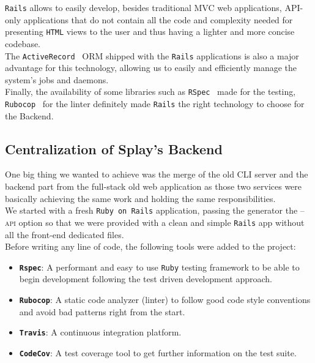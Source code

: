 \documentclass{eplmastersthesis}
\begin{document}
        \texttt{Rails} allows to easily develop, besides traditional MVC web
        applications, API-only applications that do not contain all the code
        and complexity needed for presenting \texttt{HTML} views to the user and thus
        having a lighter and more concise codebase.\\

        The \texttt{ActiveRecord}~\cite{activerecord} ORM shipped with the \texttt{Rails}
        applications is also a major advantage for this technology, allowing us
        to easily and efficiently manage the system's jobs and daemons.\\
        Finally, the availability of some libraries such as \texttt{RSpec}~\cite{rspec}
        made for the testing, \texttt{Rubocop}~\cite{Rubocop} for the linter definitely
        made \texttt{Rails} the right technology to choose for the Backend.

      \subsection{Centralization of Splay's Backend}

        One big thing we wanted to achieve was the merge of the old CLI
        server and the backend part from the full-stack old web application
        as those two services were basically achieving the same work and
        holding the same responsibilities.\\

        We started with a fresh \texttt{Ruby on Rails} application, passing the
        generator the \textsc{--api} option so that we were provided with
        a clean and simple \texttt{Rails} app without all the front-end dedicated
        files.\\

        Before writing any line of code, the following tools were added
        to the project:

        \begin{itemize}
          \item \textbf{\texttt{Rspec}}: A performant and easy to use \texttt{Ruby} testing
          framework to be able to begin development following the test
          driven development approach.
          \item \textbf{\texttt{Rubocop}}: A static code analyzer (linter) to follow
          good code style conventions and avoid bad patterns right from the start.
          \item \textbf{\texttt{Travis}}: A continuous integration platform.
          \item \textbf{\texttt{CodeCov}}: A test coverage tool to get further
          information on the test suite.
        \end{itemize}
\end{document}
